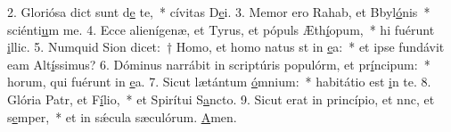 2. Gloriósa dict sunt d\uline{e} te,~* cívitas D\uline{e}i.
3. Memor ero Rahab, et Bbyl\uline{ó}nis~* sciénti\uline{u}m me.
4. Ecce alienígenæ, et Tyrus, et pópuls Æth\uline{í}opum,~* hi fuérunt \uline{i}llic.
5. Numquid Sion dicet:~† Homo, et homo natus st in \uline{e}a:~* et ipse fundávit eam Alt\uline{í}ssimus?
6. Dóminus narrábit in scriptúris populórm, et pr\uline{í}ncipum:~* horum, qui fuérunt in \uline{e}a.
7. Sicut lætántum \uline{ó}mnium:~* habitátio est \uline{i}n te.
8. Glória Patr, et F\uline{í}lio,~* et Spirítui S\uline{a}ncto.
9. Sicut erat in princípio, et nnc, et s\uline{e}mper,~* et in sǽcula sæculórum. \uline{A}men.
